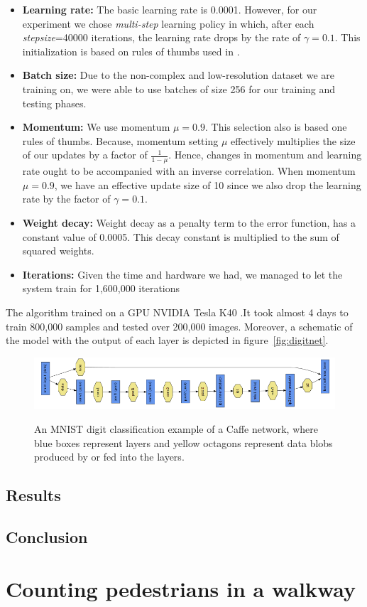 \begin{itemize}
\item \textbf{Learning rate:} The basic learning rate is 0.0001. However, for our experiment we chose \textit{multi-step} learning policy in which, after each \textit{stepsize}=40000 iterations, the learning rate drops by the rate of $\gamma = 0.1$. This initialization is based on rules of thumbs used in \cite{krizhevsky2012imagenet}.
\item \textbf{Batch size:} Due to the non-complex and low-resolution dataset we are training on, we were able to use batches of size 256 for our training and testing phases.
\item \textbf{Momentum:} We use momentum $\mu = 0.9$. This selection also is based one rules of thumbs. Because, momentum setting $\mu$ effectively multiplies the size of our updates by a factor of $\frac{1}{1-\mu}$. Hence, changes in momentum and learning rate ought to be accompanied with an inverse correlation. When momentum $\mu = 0.9$, we have an effective update size of 10 since we also drop the learning rate by the factor of $\gamma= 0.1$.
\item \textbf{Weight decay:} Weight decay as a penalty term to the error function, has a constant value of 0.0005. This decay constant is multiplied to the sum of squared weights.
\item \textbf{Iterations:} Given the time and hardware we had, we managed to let the system train for 1,600,000 iterations
\end{itemize}

\noindent The algorithm trained on a GPU NVIDIA \cite{kirk2007nvidia} Tesla K40 \cite{lindholm2008nvidia}.It took almost 4 days to train 800,000 samples and tested over 200,000 images. Moreover, a schematic of the model with the output of each layer is depicted in figure~\ref{fig:digitnet}.

\begin{figure}[H]
	\centering
	{\includegraphics[width=1\textwidth]{images/caffe}}
	\caption{An MNIST digit classification example of a Caffe network, where blue boxes represent layers and yellow octagons represent data blobs produced by or fed into the layers\cite{jia2014caffe}.}
	\label{fig:caffe}
\end{figure}


\subsection{Results}
\subsection{Conclusion}

\section{Counting pedestrians in a walkway}